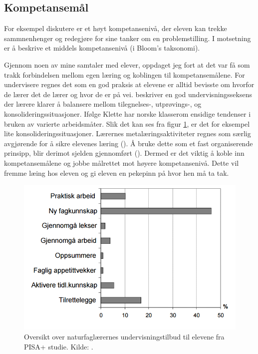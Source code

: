 \documentclass[main.tex]{subfiles}
\begin{document}
\subsection*{Kompetansemål}
For eksempel diskutere er et høyt kompetansenivå, der eleven kan trekke sammnenhenger og redegjøre for sine tanker om en problemstilling. I motsetning er å beskrive et middels kompetansenivå (i Bloom's taksonomi).


Gjennom noen av mine samtaler med elever, oppdaget jeg fort at det var få som trakk forbindelsen mellom egen læring og koblingen til kompetansemålene. For undervisere regnes det som en god praksis at elevene er alltid bevisste om hvorfor de lærer det de lærer og hvor de er på vei.  beskriver en god undervisningsseksens der lærere klarer å balansere mellom tilegnelses-, utprøvings-, og konsolideringssituasjoner. Ifølge Klette har norske klasserom ensidige tendenser i bruken av varierte arbeidsmåter. Slik det kan ses fra figur \ref{fig:odeg10}, er det for eksempel lite konsolideringssituasjoner. Lærernes metalæringsaktiviteter regnes som særlig avgjørende for å sikre elevenes læring (). Å bruke dette som et fast organiserende prinsipp, blir derimot sjelden gjennomført (). Dermed er det viktig å koble inn kompetansemålene og jobbe målrettet mot høyere kompetansenivå. Dette vil fremme læing hos eleven og gi eleven en pekepinn på hvor hen må ta tak.
\begin{figure}[h!]
\includegraphics[scale = 0.6]{../figures/undervisnings_aktivitet.png}
\caption{Oversikt over naturfaglærernes undervisningstilbud til elevene fra PISA+ studie. Kilde: 
\protect{}.}
\label{fig:odeg10}
\end{figure}
\end{document}
